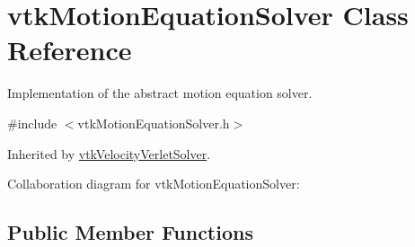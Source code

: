 \hypertarget{classvtkMotionEquationSolver}{
\section{vtkMotionEquationSolver Class Reference}
\label{classvtkMotionEquationSolver}
}


Implementation of the abstract motion equation solver.  




{\ttfamily \#include $<$vtkMotionEquationSolver.h$>$}



Inherited by \hyperlink{classvtkVelocityVerletSolver}{vtkVelocityVerletSolver}.



Collaboration diagram for vtkMotionEquationSolver:\subsection*{Public Member Functions}
